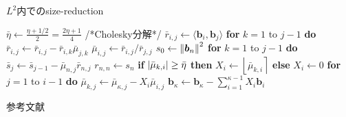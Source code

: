\documentclass[12pt,aspectratio=169,xcolor=dvipsnames,table,dvipdfmx, leqno]{beamer}
\renewcommand{\Comment}[1]{\quad/*#1*/}
\newcommand{\round}[1]{\left\lfloor #1 \right\rceil}
\begin{document}
\begin{frame}{}
\begin{algorithm}[H]
    \footnotesize
    \begin{algorithmic}[1]
        \caption{\footnotesize $L^2$内でのsize-reduction}
        \label{alg_LLL}
        \State $\bar{\eta}\gets\frac{\eta+1/2}{2}=\frac{2\eta+1}{4}$
        \Do
            \Comment{Cholesky分解}
                \State $\bar{r}_{i, j}\gets \langle\bm{b}_i, \bm{b}_j\rangle$
                \State \textbf{for} $k=1$ to $j-1$ \textbf{do} $\bar{r}_{i, j}\gets \bar{r}_{i, j}-\bar{r}_{i, k}\bar{\mu}_{j, k}$
                \State $\bar{\mu}_{i, j}\gets {\bar{r}_{i, j}}/{\bar{r}_{j, j}}$
            \EndFor
            \State $s_0\gets \norm{\bm{b}_n}^2$
            \State \textbf{for} $k = 1$ to $j-1$ \textbf{do} $\bar{s}_j\gets \bar{s}_{j-1}-\bar{\mu}_{n, j}\bar{r}_{n, j}$
            \State $r_{n, n}\gets s_n$
                \State \textbf{if} $\abs{\bar{\mu}_{k, i}}\ge \bar{\eta}$ \textbf{then} $X_i\gets \round{\bar{\mu}_{k, i}}$ \textbf{else} $X_i\gets 0$
                \State \textbf{for} $j=1$ to $i-1$ \textbf{do} $\bar{\mu}_{k, j}\gets \bar{\mu}_{\kappa, j}-X_i\bar{\mu}_{i, j}$
            \EndFor
            \State $\bm{b}_\kappa\gets \bm{b}_\kappa-\sum_{i=1}^{\kappa-1}X_i\bm{b}_i$
    \end{algorithmic}
\end{algorithm}
\end{frame}

\begin{frame}[allowframebreaks]{参考文献}
\beamertemplatetextbibitems


\end{frame}
\end{document}
